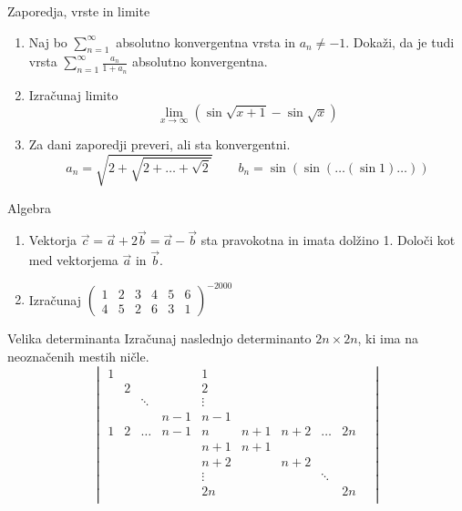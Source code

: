 \begin{frame}{Zaporedja, vrste in limite}
	\begin{enumerate}
		\item 
		Naj bo $\sum_{n=1}^{\infty}$ absolutno konvergentna vrsta in $a_n \ne -1$.
		Dokaži, da je tudi vrsta $\sum_{n=1}^\infty \frac{a_n}{1+a_n}$
		absolutno konvergentna.

		\item
		Izračunaj limito
		\[ \lim_{x\rightarrow \infty}(\sin \sqrt{x+1}-\sin \sqrt{x})\]

		\item
		Za dani zaporedji preveri, ali sta konvergentni.
		\[a_n = \sqrt{2+\sqrt{2+\dots+\sqrt{2}}} \qquad
		b_n = \sin(\sin(\dots(\sin 1)\dots))\]
		
	\end{enumerate}
\end{frame}

\begin{frame}{Algebra}
	\begin{enumerate}
		\item
		Vektorja $\vec{c}=\vec{a}+2\vec{b}=\vec{a}-\vec{b}$
		sta pravokotna in imata dolžino 1. Določi kot med vektorjema $\vec{a}$ in $\vec{b}$.
		\item 
		Izračunaj
		$ \displaystyle
		\begin{pmatrix}
			1 & 2 & 3 & 4 & 5 & 6 \\
			4 & 5 & 2 & 6 & 3 & 1
		\end{pmatrix}^{-2000}
		$
	\end{enumerate}
\end{frame}

\begin{frame}{Velika determinanta}
	Izračunaj naslednjo determinanto $2n \times 2n$, ki ima na neoznačenih mestih ničle.
	\[
	\begin{vmatrix}
		1 & & & & 1 & & & & \\
		& 2 & & & 2 & & & & \\
		& & \ddots & & \vdots & & & & \\
		& & & n-1 & n-1 & & & & \\
		1 & 2 & \ldots & n-1 & n & n+1 & n+2 & \ldots & 2n \\
		& & & & n+1 & n+1 & & &  \\ 	
		& & & & n+2 & & n+2 & & &\\
		& & & &\vdots& & & \ddots & \\
		& & & &2n & & &  &2n\\
	\end{vmatrix}
	\]
\end{frame}

